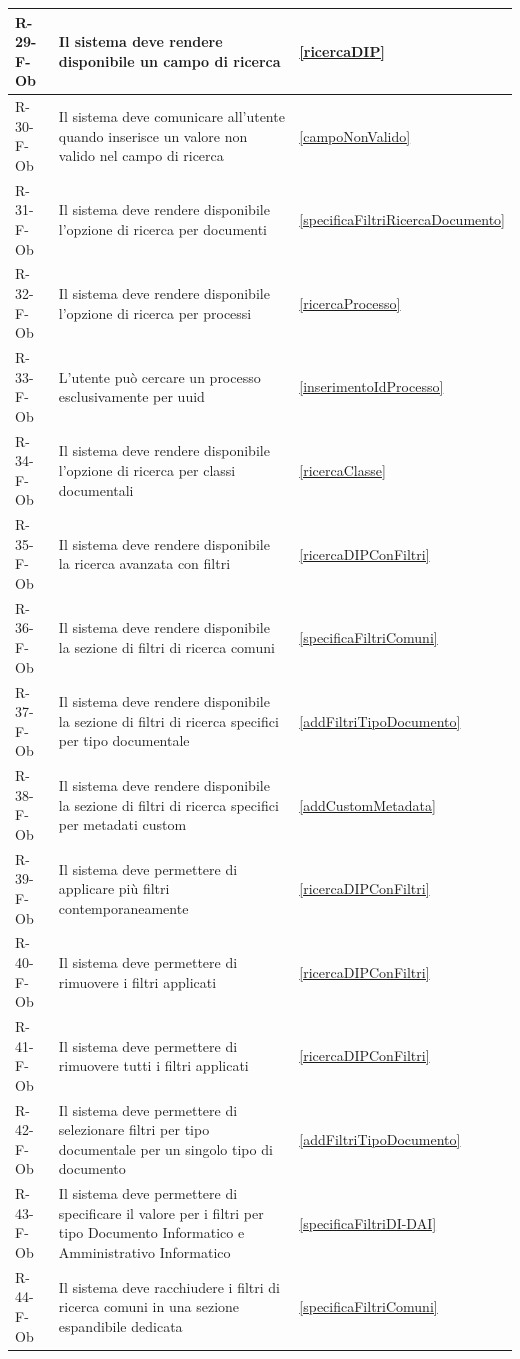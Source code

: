 \begin{longtable}{|p{2.5cm}|p{9.5cm}|p{2.5cm}|}
\hline
R-29-F-Ob & Il sistema deve rendere disponibile un campo di ricerca & \ref{ricercaDIP} \\
\hline
R-30-F-Ob & Il sistema deve comunicare all'utente quando inserisce un valore non valido nel campo di ricerca & \ref{campoNonValido} \\
\hline
R-31-F-Ob & Il sistema deve rendere disponibile l'opzione di ricerca per documenti & \ref{specificaFiltriRicercaDocumento} \\
\hline
R-32-F-Ob & Il sistema deve rendere disponibile l'opzione di ricerca per processi & \ref{ricercaProcesso} \\
\hline
R-33-F-Ob & L'utente può cercare un processo esclusivamente per uuid & \ref{inserimentoIdProcesso} \\
\hline
R-34-F-Ob & Il sistema deve rendere disponibile l'opzione di ricerca per classi documentali & \ref{ricercaClasse} \\
\hline
R-35-F-Ob & Il sistema deve rendere disponibile la ricerca avanzata con filtri & \ref{ricercaDIPConFiltri} \\
\hline
R-36-F-Ob & Il sistema deve rendere disponibile la sezione di filtri di ricerca comuni & \ref{specificaFiltriComuni} \\
\hline
R-37-F-Ob & Il sistema deve rendere disponibile la sezione di filtri di ricerca specifici per tipo documentale & \ref{addFiltriTipoDocumento} \\
\hline
R-38-F-Ob & Il sistema deve rendere disponibile la sezione di filtri di ricerca specifici per metadati custom & \ref{addCustomMetadata} \\
\hline
R-39-F-Ob & Il sistema deve permettere di applicare più filtri contemporaneamente & \ref{ricercaDIPConFiltri} \\
\hline
R-40-F-Ob & Il sistema deve permettere di rimuovere i filtri applicati & \ref{ricercaDIPConFiltri} \\
\hline
R-41-F-Ob & Il sistema deve permettere di rimuovere tutti i filtri applicati & \ref{ricercaDIPConFiltri} \\
\hline
R-42-F-Ob & Il sistema deve permettere di selezionare filtri per tipo documentale per un singolo tipo di documento & \ref{addFiltriTipoDocumento} \\
\hline
R-43-F-Ob & Il sistema deve permettere di specificare il valore per i filtri per tipo Documento Informatico e Amministrativo Informatico & \ref{specificaFiltriDI-DAI} \\
\hline
R-44-F-Ob & Il sistema deve racchiudere i filtri di ricerca comuni in una sezione espandibile dedicata & \ref{specificaFiltriComuni} \\

\end{longtable}
